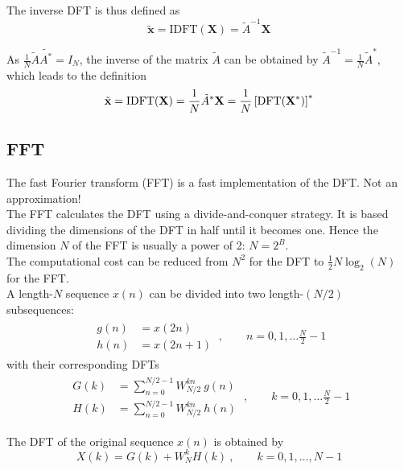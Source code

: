 The inverse DFT is thus defined as
\begin{equation*}
	\tilde{\mathbf{x}} = \text{IDFT}(\mathbf{X}) = \tilde{A}^{-1} \mathbf{X}
\end{equation*}

As $\frac{1}{N} \tilde{A} \tilde{A^*} = I_N$, the inverse of the matrix
$\tilde{A}$ can be obtained by $\tilde{A}^{-1} = \frac{1}{N} \tilde{A}^*$,
which leads to the definition
\begin{equation*}
	\tilde{\mathbf{x}} = \text{IDFT}(\mathbf{X}) = \frac{1}{N} \tilde{A}^* \mathbf{X} = \frac{1}{N}\left[ \operatorname{\text{DFT}}(\mathbf{X}^*) \right] ^*
\end{equation*}

\subsection{FFT}
The fast Fourier transform (FFT) is a fast implementation of the DFT.
Not an approximation! \\

The FFT calculates the DFT using a divide-and-conquer strategy. It is based
dividing the dimensions of the DFT in half until it becomes one. Hence
the dimension $N$ of the FFT is usually a power of 2: $N = 2^B$. \\

The computational cost can be reduced from $N^2$ for the DFT to $\frac{1}{2} N \log_2 (N)$ for the FFT. \\

A length-$N$ sequence $x(n)$ can be divided into two length-$(N/2)$ subsequences:
\begin{align*}
	\begin{array}{ll}
		g(n) &= x(2n) \\
		h(n) &= x(2n+1)
	\end{array}
	\:,\qquad n = 0,1,\ldots \frac{N}{2}-1
\end{align*}
with their corresponding DFTs
\begin{align*}
	\begin{array}{ll}
		G(k) &= \sum\limits_{n=0}^{N/2-1} W_{N/2}^{kn} \: g(n) \\
		H(k) &= \sum\limits_{n=0}^{N/2-1} W_{N/2}^{kn} \: h(n)
	\end{array}
	\:,\qquad k=0,1,\ldots \frac{N}{2}-1
\end{align*}

The DFT of the original sequence $x(n)$ is obtained by
\begin{equation*}
	X(k) = G(k) + W_N^k H(k) \:,\qquad k=0,1,\ldots,N-1
\end{equation*}

